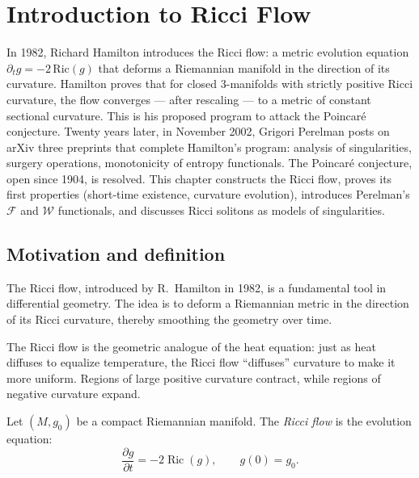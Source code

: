 \chapter{Introduction to Ricci Flow}
\label{ch:ricci_flow}

In 1982, Richard Hamilton introduces the Ricci flow: a metric evolution equation $\partial_t g = -2\,\mathrm{Ric}(g)$ that deforms a Riemannian manifold in the direction of its curvature. Hamilton proves that for closed 3-manifolds with strictly positive Ricci curvature, the flow converges --- after rescaling --- to a metric of constant sectional curvature. This is his proposed program to attack the Poincaré conjecture. Twenty years later, in November 2002, Grigori Perelman posts on arXiv three preprints that complete Hamilton's program: analysis of singularities, surgery operations, monotonicity of entropy functionals. The Poincaré conjecture, open since 1904, is resolved. This chapter constructs the Ricci flow, proves its first properties (short-time existence, curvature evolution), introduces Perelman's $\mathcal{F}$ and $\mathcal{W}$ functionals, and discusses Ricci solitons as models of singularities.

\section{Motivation and definition}

The Ricci flow, introduced by R.~Hamilton in 1982, is a fundamental tool in
differential geometry. The idea is to deform a Riemannian metric in the direction
of its Ricci curvature, thereby smoothing the geometry over time.

\begin{intuition}
The Ricci flow is the geometric analogue of the heat equation: just as heat
diffuses to equalize temperature, the Ricci flow ``diffuses'' curvature to make
it more uniform. Regions of large positive curvature contract, while regions of
negative curvature expand.
\end{intuition}

\begin{definition}
Let $(M, g_0)$ be a compact Riemannian manifold. The \emph{Ricci flow} is the
evolution equation:
\[
    \frac{\partial g}{\partial t} = -2\operatorname{Ric}(g), \qquad g(0) = g_0.
\]
\end{definition}

